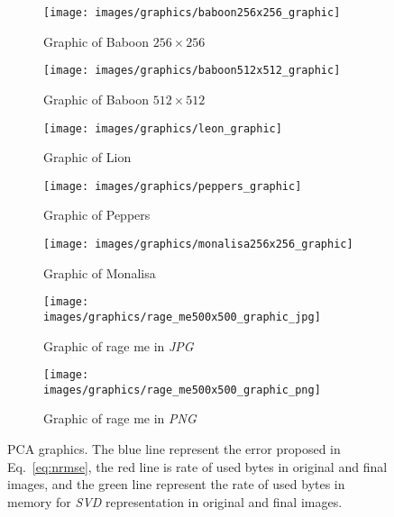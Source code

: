 \documentclass[journal]{IEEEtran}
\begin{document}
\begin{figure}
	\centering
	\begin{subfigure}{0.23\textwidth}
		\centering
		\texttt{[image: images/graphics/baboon256x256\_graphic]} 
		\caption{Graphic of Baboon $256\times 256$}
		\label{fig:graphic:baboon256} 
	\end{subfigure}
	\centering
	\begin{subfigure}{0.23\textwidth}
		\centering
		\texttt{[image: images/graphics/baboon512x512\_graphic]}
		\caption{Graphic of Baboon $512\times 512$}
		\label{fig:graphic:baboon512}
	\end{subfigure}
	
	\centering
	\begin{subfigure}{0.48\textwidth}
		\centering
		\texttt{[image: images/graphics/leon\_graphic]} 
		\caption{Graphic of Lion}
		\label{fig:graphic:lion} 
	\end{subfigure}
	\centering
	\begin{subfigure}{0.23\textwidth}
		\centering
		\texttt{[image: images/graphics/peppers\_graphic]} 
		\caption{Graphic of Peppers}
		\label{fig:graphic:peppers} 
	\end{subfigure}
	\centering
	\begin{subfigure}{0.23\textwidth}
		\centering
		\texttt{[image: images/graphics/monalisa256x256\_graphic]}
		\caption{Graphic of Monalisa}
		\label{fig:graphic:monalisa}
	\end{subfigure}
	
	
	\centering
	\begin{subfigure}{0.23\textwidth}
		\centering
		\texttt{[image: images/graphics/rage\_me500x500\_graphic\_jpg]} 
		\caption{Graphic of rage me in \textit{JPG}}
		\label{fig:graphic:rage_me_jpg} 
	\end{subfigure}
	\centering
	\begin{subfigure}{0.23\textwidth}
		\centering
		\texttt{[image: images/graphics/rage\_me500x500\_graphic\_png]}
		\caption{Graphic of rage me in \textit{PNG}}
		\label{fig:graphic:rage_me_png}
	\end{subfigure}
	
	
	\caption{PCA graphics. The blue line represent the error proposed in Eq.~\ref{eq:nrmse}, the red line is rate of used bytes in original and final images, and the green line represent the rate of used bytes in memory for  \textit{SVD} representation in original and final images.}
	\label{fig:graphics}
\end{figure}
\end{document}
